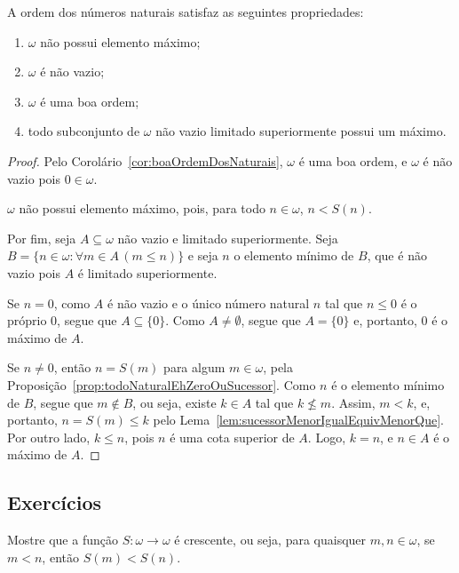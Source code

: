 \begin{proposition}[$Z^--P$]\label{prop:caracterizacaoBasicaDaOrdemNosNaturais}
    A ordem dos números naturais satisfaz as seguintes propriedades:
    \begin{enumerate}[label=(\roman*)]
        \item $\omega$ não possui elemento máximo;
        \item $\omega$ é não vazio;
        \item $\omega$ é uma boa ordem;
        \item todo subconjunto de $\omega$ não vazio limitado superiormente possui um máximo.
    \end{enumerate}
\end{proposition}
\begin{proof}
    Pelo Corolário~\ref{cor:boaOrdemDosNaturais}, $\omega$ é uma boa ordem, e $\omega$ é não vazio pois $0 \in \omega$.

    $\omega$ não possui elemento máximo, pois, para todo $n \in \omega$, $n < S(n)$.

    Por fim, seja $A\subseteq \omega$ não vazio e limitado superiormente.
    Seja $B=\{n \in \omega : \forall m \in A\, (m \leq n)\}$ e seja $n$ o elemento mínimo de $B$, que é não vazio pois $A$ é limitado superiormente.

    Se $n=0$, como $A$ é não vazio e o único número natural $n$ tal que $n\leq 0$ é o próprio $0$, segue que $A\subseteq\{0\}$.
    Como $A\neq \emptyset$, segue que $A=\{0\}$ e, portanto, $0$ é o máximo de $A$.

    Se $n\neq 0$, então $n=S(m)$ para algum $m \in \omega$, pela Proposição~\ref{prop:todoNaturalEhZeroOuSucessor}.
    Como $n$ é o elemento mínimo de $B$, segue que $m \notin B$, ou seja, existe $k \in A$ tal que $k \not\leq m$.
    Assim, $m<k$, e, portanto, $n=S(m)\leq k$ pelo Lema~\ref{lem:sucessorMenorIgualEquivMenorQue}.
    Por outro lado, $k \leq n$, pois $n$ é uma cota superior de $A$.
    Logo, $k=n$, e $n\in A$ é o máximo de $A$.
\end{proof}

\subsection*{Exercícios}
\begin{exercise}[$Z^--P$]\label{ex:sucessorCrescente}
    Mostre que a função $S:\omega \to \omega$ é crescente, ou seja, para quaisquer $m, n \in \omega$, se $m < n$, então $S(m) < S(n)$.
\end{exercise}
